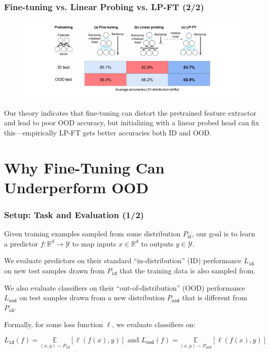 \documentclass[16pt,aspectratio=169]{beamer}
\begin{document}
\begin{frame}
    \frametitle{Fine-tuning vs. Linear Probing vs. LP-FT (2/2)}

    \begin{figure}[htbp]
        \centering
        \includegraphics[width=\textwidth]{figures/illustration.png}
    \end{figure}

    Our theory indicates that fine-tuning can distort the pretrained feature extractor and lead to poor OOD accuracy, but {\color{blue} initializing with a linear probed head} can fix this—empirically LP-FT gets better accuracies both ID and OOD.

\end{frame}

\section{Why Fine-Tuning Can Underperform OOD}

\begin{frame}
    \frametitle{Setup: Task and Evaluation (1/2)}

    Given training examples sampled from some distribution $P_{\text {id}}$, our goal is to learn a predictor $f: \mathbb{R}^d \rightarrow \mathcal{Y}$ to map inputs $x \in \mathbb{R}^d$ to outputs $y \in \mathcal{Y}$.

    We evaluate predictors on their standard ``in-distribution'' (ID) performance $L_{\mathtt{id}}$ on new test samples drawn from $P_{\mathtt {id}}$ that the training data is also sampled from.

    We also evaluate classifiers on their ``out-of-distribution'' (OOD) performance $L_{\mathtt {ood}}$ on test samples drawn from a new distribution $P_{\mathtt {ood}}$ that is different from $P_{\mathtt {id}}$.

    Formally, for some loss function $\ell$, we evaluate classifiers on:

    \begin{equation}
        L_{\mathtt{id}}(f)=\underset{(x, y) \sim P_{\mathtt{id}}}{\mathbb{E}}[\ell(f(x), y)] \text { and } L_{\mathtt{ood}}(f)=\underset{(x, y) \sim P_{\mathtt{ood}}}{\mathbb{E}}[\ell(f(x), y)]
    \end{equation}

\end{frame}
\end{document}
